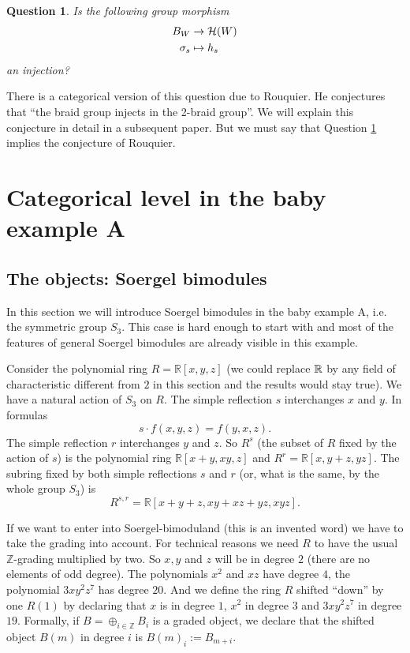 \documentclass[12pt]{wart}
\newtheorem{ques}[thm]{Question}
\theoremstyle{remark}
\begin{document}
\begin{ques}\label{braid} Is the following group morphism
\begin{align*}
B_W&\rightarrow \mathcal H(W)\\
\sigma_s&\mapsto h_s
\end{align*}
an injection?
\end{ques}


There is a categorical version of this question due to Rouquier. He conjectures that ``the braid group injects in the 2-braid group''. We will explain this conjecture in detail in a subsequent paper. But we must say that  Question \ref{braid} implies the conjecture of Rouquier. 















\section{Categorical level in the baby example A}\label{babyA}

\subsection{The objects: Soergel bimodules}

In this section we will introduce Soergel bimodules  in the baby example A, i.e. the symmetric group $S_3.$ This case is hard enough to start with and most of the features of general Soergel bimodules are already visible in this example. 

 Consider the polynomial ring $R=\mathbb{R}[x,y,z]$ (we could replace $\mathbb R$ by any field of characteristic different from $2$ in this section and the results would stay true). We have a natural action of $S_3$ on $R$. The simple reflection $s$ interchanges $x$ and $y$. In formulas $$s\cdot f(x,y,z)=f(y,x,z).$$ The simple reflection $r$ interchanges $y$ and $z$.  So $R^s$ (the subset of $R$ fixed by the action of $s$) is the polynomial ring $\mathbb{R}[x+y, xy, z]$ and $R^r=\mathbb{R}[x, y+z,yz].$ The subring fixed by both simple reflections $s$ and $r$ (or, what is the same, by the whole group $S_3$) is $$R^{s,r}=\mathbb{R}[x+y+z,xy+xz+yz,xyz].$$ 

 If we want to enter into Soergel-bimoduland (this is an invented word) we have to take the grading into account. For technical reasons we need $R$ to have the usual $\mathbb{Z}$-grading multiplied by two. So $x,y$ and $z$ will be in degree $2$ (there are no elements of odd degree). The polynomials $x^2$ and $xz$ have degree $4$, the polynomial $3xy^2z^7$ has degree $20.$ And we define the ring $R$ shifted ``down'' by one $R(1)$ by declaring that $x$ is in degree $1$,  $x^2$ in degree $3$ and $3xy^2z^7$ in degree $19.$ Formally, if $B=\oplus_{i\in \mathbb{Z}}B_i$ is a graded object, we declare that the shifted object $B(m)$ in degree $i$ is $B(m)_i:=B_{m+i}.$
\end{document}
